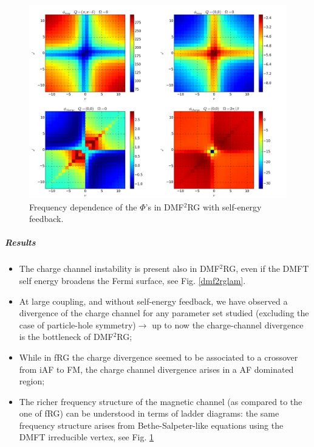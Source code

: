 \begin{figure}
\includegraphics[scale=0.25]{images/Merged_dmf2rg_se.png}
\caption{Frequency dependence of the $\Phi$'s in DMF$^2$RG with self-energy feedback.} \label{dmf2rfreq}
\end{figure}

\subparagraph{Results} 
\begin{itemize}

\item The charge channel instability is present also in DMF$^2$RG, even if the DMFT self energy broadens the Fermi surface, see Fig. \ref{dmf2rglam}.  

\item At large coupling, and without self-energy feedback, we have observed a divergence of the charge channel for any parameter set studied (excluding the case of particle-hole symmetry)$\rightarrow$ up to now the charge-channel divergence is the bottleneck of DMF$^2$RG;  

\item While in fRG the charge divergence seemed to be associated to a crossover from iAF to FM, the charge channel divergence arises in a  AF dominated region;
 
\item The richer frequency structure of the magnetic channel (as compared to the one of fRG) can be understood in terms of ladder diagrams: the same frequency structure arises from Bethe-Salpeter-like equations using the DMFT irreducible vertex, see Fig. \ref{dmf2rfreq}

\end{itemize}

